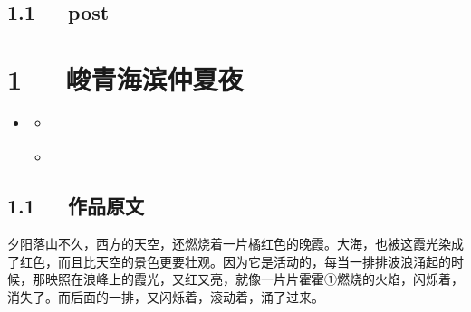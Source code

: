 \documentclass[letterpaper,12pt,english]{sphinxmanual}
\begin{document}
\section{1.1   post}
\label{\detokenize{p01_u6563_u6587/Hello_uff0cp01_u6563_u6587:post}}

\chapter{1   峻青\sphinxhyphen{}海滨仲夏夜}
\label{\detokenize{p01_u6563_u6587/_u5cfb_u9752-_u6d77_u6ee8_u4ef2_u590f_u591c:id1}}\label{\detokenize{p01_u6563_u6587/_u5cfb_u9752-_u6d77_u6ee8_u4ef2_u590f_u591c::doc}}
\begin{sphinxShadowBox}
\begin{itemize}
\item {} 
\label{\detokenize{p01_u6563_u6587/_u5cfb_u9752-_u6d77_u6ee8_u4ef2_u590f_u591c:id5}}{\hyperref[\detokenize{p01_u6563_u6587/_u5cfb_u9752-_u6d77_u6ee8_u4ef2_u590f_u591c:id1}]{}}
\begin{itemize}
\item {} 
\label{\detokenize{p01_u6563_u6587/_u5cfb_u9752-_u6d77_u6ee8_u4ef2_u590f_u591c:id6}}{\hyperref[\detokenize{p01_u6563_u6587/_u5cfb_u9752-_u6d77_u6ee8_u4ef2_u590f_u591c:id3}]{}}

\item {} 
\label{\detokenize{p01_u6563_u6587/_u5cfb_u9752-_u6d77_u6ee8_u4ef2_u590f_u591c:id7}}{\hyperref[\detokenize{p01_u6563_u6587/_u5cfb_u9752-_u6d77_u6ee8_u4ef2_u590f_u591c:id4}]{}}

\end{itemize}

\end{itemize}
\end{sphinxShadowBox}


\section{1.1   作品原文}
\label{\detokenize{p01_u6563_u6587/_u5cfb_u9752-_u6d77_u6ee8_u4ef2_u590f_u591c:id3}}
夕阳落山不久，西方的天空，还燃烧着一片橘红色的晚霞。大海，也被这霞光染成了红色，而且比天空的景色更要壮观。因为它是活动的，每当一排排波浪涌起的时候，那映照在浪峰上的霞光，又红又亮，就像一片片霍霍①燃烧的火焰，闪烁着，消失了。而后面的一排，又闪烁着，滚动着，涌了过来。
\end{document}
